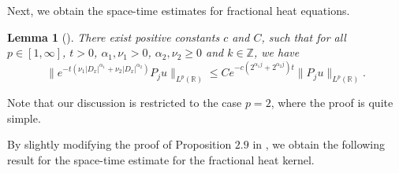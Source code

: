 \documentclass[12pt]{amsart}
\newtheorem{lemma}[theorem]{Lemma}
\theoremstyle{definition}
\numberwithin{equation}{section}
\newcommand{\R}{\mathbb{R}}
\newcommand{\al}{\alpha}
\begin{document}
Next, we obtain the space-time estimates for fractional heat equations. 
\begin{lemma}[\hspace{1sp}\cite{MR2768550}] \label{Heates1}
There exist positive constants $c$ and $C$, such that for all $p\in [1, \infty]$, $t>0$, $\alpha_1,\nu_1>0$, $\alpha_2,\nu_2\geq0$ and $k\in \mathbb{Z}$, we have
\begin{equation*}
 \|e^{-t(\nu_1|D_x|^{\alpha_1}+\nu_2|D_x|^{\al_2})}P_ju\|_{L^p(\R)} \leq C e^{-c (2^{\alpha_1j}+2^{\al_2j} )t} \|P_j u\|_{L^p(\R)}.
\end{equation*}
\end{lemma}
Note that our discussion is restricted to the case 
$p=2$, where the proof is quite simple.

By slightly modifying the proof of Proposition $2.9$ in \cite{MR4348695}, we obtain the following result for the space-time estimate for the fractional heat kernel.
\end{document}
